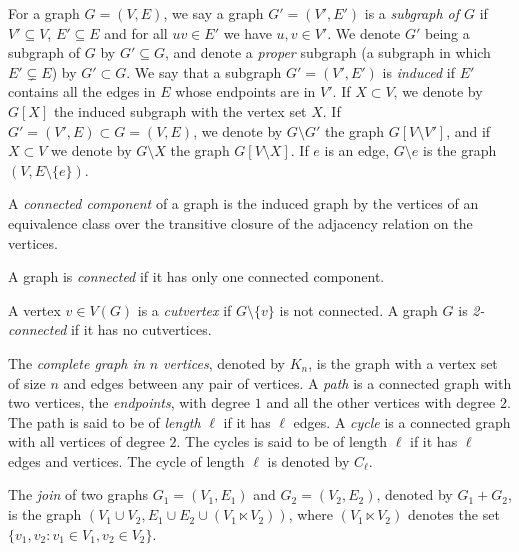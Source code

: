 \begin{definition}
	For a graph $G = (V, E)$, we say a graph $G' = (V', E')$ is a \emph{subgraph of $G$}
	 if $V' \subseteq V$, $E' \subseteq E$ and for all  $uv \in E'$ we have $u, v \in V'$. 
	 We denote $G'$ being a subgraph of $G$ by $G' \subseteq G$, and denote a \emph{proper}
	 subgraph (a subgraph in which $E' \subsetneq E$) by $G' \subset G$. 
	 We say that a subgraph $G' = (V', E')$ is \emph{induced} if $E'$ contains all the edges
	 in $E$ whose endpoints are in $V'$. If $X \subset V$, we denote by $G[X]$ the induced
	 subgraph with the vertex set $X$. If $G' = (V', E) \subset G = (V, E)$, we denote by
	 $G \setminus G'$ the graph $G[V \setminus V']$, and if $X \subset V$ we denote by
	  $G \setminus X$
	 the graph $G[V \setminus X]$. If $e$ is an edge, $G \setminus e$ is the graph $(V, E \setminus \{e\})$.
\end{definition}

\begin{definition}
	A \emph{connected component} of a graph is the induced graph by the vertices of an equivalence
	class over the transitive closure of the adjacency relation on the vertices. 
	
	A graph is \emph{connected} if it has only one connected component.
	
	A vertex $v \in V(G)$ is a \emph{cutvertex} if $G \setminus \{v\}$ is not connected.
	A graph $G$ is \emph{2-connected} if it has no cutvertices. 
\end{definition}

\begin{definition}
	The \emph{complete graph in $n$ vertices}, denoted by $K_n$, is the graph with a vertex set
	of size $n$ and edges between any pair of vertices. 
	A \emph{path} is a connected graph with two vertices, the \emph{endpoints}, with degree
	$1$ and all the other vertices with degree $2$. The path is said to be of \emph{length} $\ell$
	if it has $\ell$ edges. 
	A \emph{cycle} is a connected graph with all vertices of degree $2$. The cycles is said
	to be of length $\ell$ if it has $\ell$ edges and vertices. The cycle of length $\ell$ is
	denoted by $C_\ell$. 
\end{definition}

\begin{definition}
The \emph{join} of two graphs $G_1 = (V_1, E_1)$ and $G_2 = (V_2, E_2)$, denoted by 
$G_1 + G_2$, is the graph $(V_1 \cup V_2, E_1 \cup E_2 \cup (V_1 \ltimes V_2))$,
where $(V_1 \ltimes V_2)$ denotes the set $\{{v_1, v_2} : v_1 \in V_1, v_2 \in V_2\}$. 
\end{definition}

